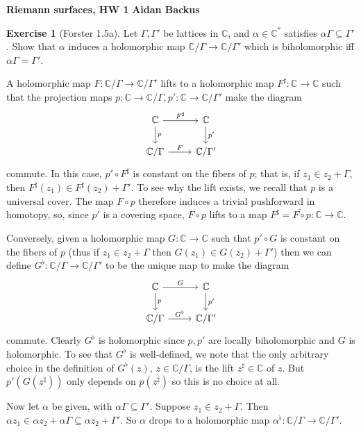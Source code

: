\documentclass[10pt]{article}
\newcommand{\CC}{\mathbb{C}}
\theoremstyle{definition}
\newtheorem{exer}{Exercise}
\begin{document}
\noindent
\large\textbf{Riemann surfaces, HW 1} \hfill \textbf{Aidan Backus} \\

\begin{exer}[Forster 1.5a]
Let $\Gamma,\Gamma'$ be lattices in $\CC$, and $\alpha \in \CC^*$ satisfies $\alpha \Gamma \subseteq \Gamma'$.
Show that $\alpha$ induces a holomorphic map $\CC/\Gamma \to \CC/\Gamma'$ which is biholomorphic iff $\alpha \Gamma = \Gamma'$.
\end{exer}

A holomorphic map $F: \CC/\Gamma \to \CC/\Gamma'$ lifts to a holomorphic map $F^\sharp: \CC \to \CC$ such that the projection maps $p: \CC \to \CC/\Gamma, p': \CC \to \CC/\Gamma'$ make the diagram
$$\begin{tikzcd}
\CC \arrow[r,"F^\sharp"] \arrow[d,"p"] & \CC \arrow[d,"p'"]\\
\CC/\Gamma \arrow[r,"F"] & \CC/\Gamma'
\end{tikzcd}$$
commute.
In this case, $p' \circ F^\sharp$ is constant on the fibers of $p$; that is, if $z_1 \in z_2 + \Gamma$, then $F^\sharp(z_1) \in F^\sharp(z_2) + \Gamma'$.
To see why the lift exists, we recall that $p$ is a universal cover.
The map $F \circ p$ therefore induces a trivial pushforward in homotopy, so, since $p'$ is a covering space, $F \circ p$ lifts to a map $F^\sharp = \widetilde{F \circ p}: \CC \to \CC$.

Conversely, given a holomorphic map $G: \CC \to \CC$ such that $p' \circ G$ is constant on the fibers of $p$ (thus if $z_1 \in z_2 + \Gamma$ then $G(z_1) \in G(z_2) + \Gamma'$) then we can define $G^\flat: \CC/\Gamma \to \CC/\Gamma'$ to be the unique map to make the diagram
$$\begin{tikzcd}
\CC \arrow[r,"G"] \arrow[d,"p"] & \CC \arrow[d,"p'"]\\
\CC/\Gamma \arrow[r,"G^\flat"] & \CC/\Gamma'
\end{tikzcd}$$
commute. Clearly $G^\flat$ is holomorphic since $p, p'$ are locally biholomorphic and $G$ is holomorphic.
To see that $G^\flat$ is well-defined, we note that the only arbitrary choice in the definition of $G^\flat(z)$, $z \in \CC/\Gamma$, is the lift $z^\sharp \in \CC$ of $z$.
But $p'(G(z^\sharp))$ only depends on $p(z^\sharp)$ so this is no choice at all.

Now let $\alpha$ be given, with $\alpha \Gamma \subseteq \Gamma'$.
Suppose $z_1 \in z_2 + \Gamma$. Then $\alpha z_1 \in \alpha z_2 + \alpha \Gamma \subseteq \alpha z_2 + \Gamma'$.
So $\alpha$ drops to a holomorphic map $\alpha^\flat: \CC/\Gamma \to \CC/\Gamma'$.
\end{document}
